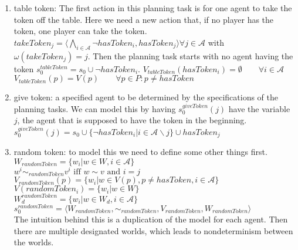 \begin{enumerate}
  \item table token:
    The first action in this planning task is for one agent to take the token off the table. Here we need a new action that, if no player has the token, one player can take the token.\\
    $takeToken_j=\langle \bigwedge\limits_{i \in \mathcal{A}}
    \neg hasToken_i, hasToken_j \rangle \forall j \in \mathcal{A}$ with $\omega(takeToken_j)=j$. Then the planning task starts with no agent having the token
    $s_0^{tableToken} = s_0 \cup \neg hasToken_i$.
    $V_{tableToken}(hasToken_i)=\emptyset \qquad \forall i\in \mathcal{A}$\\
    $V_{tableToken}(p)=V(p) \qquad \forall p\in P : p \not = hasToken$

  \item give token:
    a specified agent to be determined by the specifications of the planning tasks. We can model this by having $s_0^{giveToken}(j)$ have the variable $j$, the agent that is supposed to have the token in the beginning.
     $s_0^{giveToken}(j) = s_0 \cup \{\neg hasToken_i|i \in \mathcal{A} \backslash j\} \cup hasToken_j$

  \item random token:
    to model this we need to define some other things first.
    $W_{randomToken}=\{w_i|w \in W, i\in \mathcal{A}\}$ \\
    $w^i \sim_{randomToken} v^i \text{ iff } w \sim v \text{ and } i=j$ \\
    $V_{randomToken}(p)=\{w_i|w\in V(p), p \not = hasToken, i\in \mathcal{A}\}$ \\
    $V(randomToken_i)=\{w_i|w \in W\}$ \\
    $W^{randomToken}_d=\{w_i|w\in W_d, i\in \mathcal{A}\}$ \\
    $s_0^{randomToken}=\langle W_{randomToken}, \sim_{randomToken}, V_{randomToken}, W_{randomToken} \rangle$ \\
    The intuition behind this is a duplication of the model for each agent. Then there are multiple designated worlds, which leads to nondeterminism between the worlds.
\end{enumerate}



